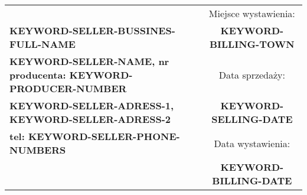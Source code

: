 \documentclass[a4paper]{book}
\begin{document}

\begin{table}[H]
\begin{tabularx}{\textwidth}{X c c}
\cline{3-3}
                                                 &  & \cellcolor[HTML]{C0C0C0}Miejsce wystawienia: \\
\centering\textbf{KEYWORD-SELLER-BUSSINES-FULL-NAME} &  & \textbf{KEYWORD-BILLING-TOWN}                              \\ \cline{3-3} 
\centering\textbf{KEYWORD-SELLER-NAME, nr producenta: KEYWORD-PRODUCER-NUMBER} &  & \cellcolor[HTML]{C0C0C0}Data sprzedaży:      \\
\centering\textbf{KEYWORD-SELLER-ADRESS-1, KEYWORD-SELLER-ADRESS-2}     &  & \textbf{KEYWORD-SELLING-DATE}                     \\ \cline{3-3} 
\centering\textbf{tel: KEYWORD-SELLER-PHONE-NUMBERS}                 &  & \cellcolor[HTML]{C0C0C0}Data wystawienia:    \\
                                                 &  & \textbf{KEYWORD-BILLING-DATE}                     \\ \cline{3-3} 
\end{tabularx}
\end{table}

\end{document}
